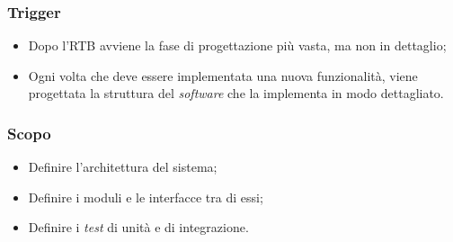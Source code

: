 \subsubsection*{Trigger}
\begin{itemize}
	\item Dopo l'RTB avviene la fase di progettazione più vasta, ma non in dettaglio;
	\item Ogni volta che deve essere implementata una nuova funzionalità, viene progettata la struttura del \textit{software} che la implementa in modo dettagliato.
\end{itemize}

\subsubsection*{Scopo}
\begin{itemize}
	\item Definire l'architettura del sistema;
	\item Definire i moduli e le interfacce tra di essi;
	\item Definire i \textit{test} di unità e di integrazione.
\end{itemize}

